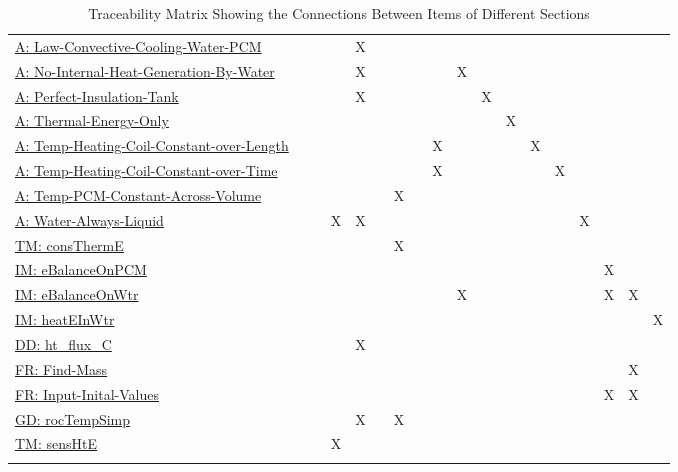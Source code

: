 \documentclass[12pt]{article}
\begin{document}
\begin{longtable}{l l l l l l l l l l l l l l l l l l}
\hyperref[A:Law-Convective-Cooling-Water-PCM]{A: Law-Convective-Cooling-Water-PCM} &  &  &  & X &  &  &  &  &  &  &  &  &  &  &  &  & 
\\
\hyperref[A:No-Internal-Heat-Generation-By-Water]{A: No-Internal-Heat-Generation-By-Water} &  &  &  & X &  &  &  &  & X &  &  &  &  &  &  &  & 
\\
\hyperref[A:Perfect-Insulation-Tank]{A: Perfect-Insulation-Tank} &  &  &  & X &  &  &  &  &  & X &  &  &  &  &  &  & 
\\
\hyperref[A:Thermal-Energy-Only]{A: Thermal-Energy-Only} &  &  &  &  &  &  &  &  &  &  & X &  &  &  &  &  & 
\\
\hyperref[A:Temp-Heating-Coil-Constant-over-Length]{A: Temp-Heating-Coil-Constant-over-Length} &  &  &  &  &  &  &  & X &  &  &  & X &  &  &  &  & 
\\
\hyperref[A:Temp-Heating-Coil-Constant-over-Time]{A: Temp-Heating-Coil-Constant-over-Time} &  &  &  &  &  &  &  & X &  &  &  &  & X &  &  &  & 
\\
\hyperref[A:Temp-PCM-Constant-Across-Volume]{A: Temp-PCM-Constant-Across-Volume} &  &  &  &  &  & X &  &  &  &  &  &  &  &  &  &  & 
\\
\hyperref[A:Water-Always-Liquid]{A: Water-Always-Liquid} &  &  & X & X &  &  &  &  &  &  &  &  &  & X &  &  & 
\\
\hyperref[TM:consThermE]{TM: consThermE} &  &  &  &  &  & X &  &  &  &  &  &  &  &  &  &  & 
\\
\hyperref[IM:eBalanceOnPCM]{IM: eBalanceOnPCM} &  &  &  &  &  &  &  &  &  &  &  &  &  &  & X &  & 
\\
\hyperref[IM:eBalanceOnWtr]{IM: eBalanceOnWtr} &  &  &  &  &  &  &  &  & X &  &  &  &  &  & X & X & 
\\
\hyperref[IM:heatEInWtr]{IM: heatEInWtr} &  &  &  &  &  &  &  &  &  &  &  &  &  &  &  &  & X
\\
\hyperref[DD:ht.flux.C]{DD: ht\_flux\_C} &  &  &  & X &  &  &  &  &  &  &  &  &  &  &  &  & 
\\
\hyperref[reqFM]{FR: Find-Mass} &  &  &  &  &  &  &  &  &  &  &  &  &  &  &  & X & 
\\
\hyperref[reqIIV]{FR: Input-Inital-Values} &  &  &  &  &  &  &  &  &  &  &  &  &  &  & X & X & 
\\
\hyperref[GD:rocTempSimp]{GD: rocTempSimp} &  &  &  & X &  & X &  &  &  &  &  &  &  &  &  &  & 
\\
\hyperref[TM:sensHtE]{TM: sensHtE} &  &  & X &  &  &  &  &  &  &  &  &  &  &  &  &  & 
\\
\bottomrule
\caption{Traceability Matrix Showing the Connections Between Items of Different Sections}
\label{Table:Tracey}
\end{longtable}
\end{document}
